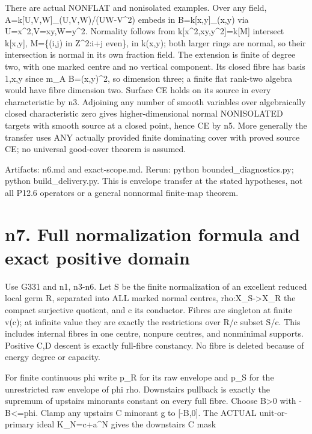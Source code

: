 \documentclass[11pt]{article}
\begin{document}
There are actual NONFLAT and nonisolated examples. Over any field, A=k[U,V,W]\_(U,V,W)/(UW-V\textasciicircum{}2) embeds in B=k[x,y]\_(x,y) via U=x\textasciicircum{}2,V=xy,W=y\textasciicircum{}2. Normality follows from k[x\textasciicircum{}2,xy,y\textasciicircum{}2]=k[M] intersect k[x,y], M=\{(i,j) in Z\textasciicircum{}2:i+j even\}, in k(x,y); both larger rings are normal, so their intersection is normal in its own fraction field. The extension is finite of degree two, with one marked centre and no vertical component. Its closed fibre has basis 1,x,y since m\_A B=(x,y)\textasciicircum{}2, so dimension three; a finite flat rank-two algebra would have fibre dimension two. Surface CE holds on its source in every characteristic by n3. Adjoining any number of smooth variables over algebraically closed characteristic zero gives higher-dimensional normal NONISOLATED targets with smooth source at a closed point, hence CE by n5. More generally the transfer uses ANY actually provided finite dominating cover with proved source CE; no universal good-cover theorem is assumed.

Artifacts: n6.md and exact-scope.md. Rerun: python bounded\_diagnostics.py; python build\_delivery.py. This is envelope transfer at the stated hypotheses, not all P12.6 operators or a general nonnormal finite-map theorem.


\section*{n7. Full normalization formula and exact positive domain}

Use G331 and n1, n3-n6. Let S be the finite normalization of an excellent reduced local germ R, separated into ALL marked normal centres, rho:X\_S->X\_R the compact surjective quotient, and c its conductor. Fibres are singleton at finite v(c); at infinite value they are exactly the restrictions over R/c subset S/c. This includes internal fibres in one centre, nonpure centres, and nonminimal supports. Positive C,D descent is exactly full-fibre constancy. No fibre is deleted because of energy degree or capacity.

For finite continuous phi write p\_R for its raw envelope and p\_S for the unrestricted raw envelope of phi rho. Downstairs pullback is exactly the supremum of upstairs minorants constant on every full fibre. Choose B>0 with -B<=phi. Clamp any upstairs C minorant g to [-B,0]. The ACTUAL unit-or-primary ideal K\_N=c+a\textasciicircum{}N gives the downstairs C mask
\end{document}
